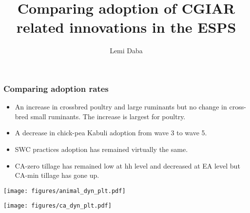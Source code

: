 \documentclass[11pt]{beamer}
\begin{document}
\author{Lemi Daba}
\title{Comparing adoption of CGIAR related innovations in the ESPS}
\begin{frame}[plain]
	\maketitle
\end{frame}

\begin{frame}
\frametitle{Comparing adoption rates}
\begin{itemize}
\item An increase in crossbred poultry and large ruminants but no change in cross-bred small ruminants. The increase is largest for poultry. 

\item A decrease in chick-pea Kabuli adoption from wave 3 to wave 5. 

\item SWC practices adoption has remained virtually the same.

\item CA-zero tillage has remained low at hh level and decreased at EA level but CA-min tillage has gone up.

\end{itemize}

\end{frame}


\begin{frame}
\texttt{[image: figures/animal\_dyn\_plt.pdf]}
\end{frame}


\begin{frame}
\texttt{[image: figures/ca\_dyn\_plt.pdf]}
\end{frame}
\end{document}
